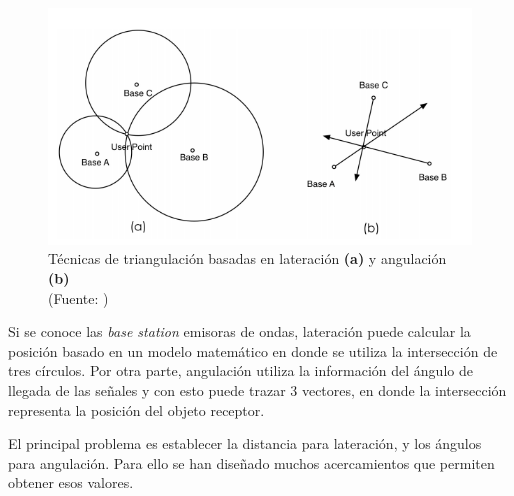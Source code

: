 \begin{figure}[ht!]
\centering
\includegraphics[width=.6\textwidth]{figures/triangulacion.png}
\caption[Lateración y Angulación]{Técnicas de triangulación basadas en lateración \textbf{(a)} y angulación \textbf{(b)}\\
{\scriptsize (Fuente: \citep{Liu:2007:SWI:2220431.2221077})}}
\label{fig:triangulacion}
\end{figure}

Si se conoce las \textit{base station} emisoras de ondas, lateración puede calcular la posición basado en un modelo matemático en donde se utiliza la intersección de tres círculos. Por otra parte, angulación utiliza la información del ángulo de llegada de las señales y con esto puede trazar 3 vectores, en donde la intersección representa la posición del objeto receptor.

El principal problema es establecer la distancia para lateración, y los ángulos para angulación. Para ello se han diseñado muchos acercamientos que permiten obtener esos valores.

